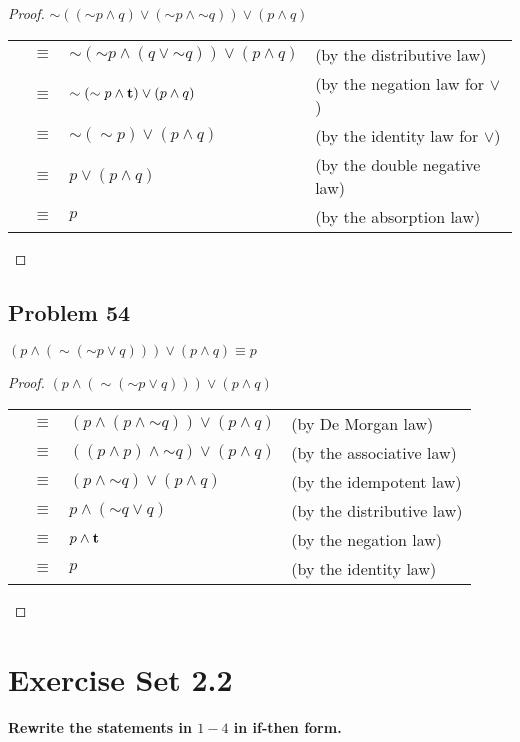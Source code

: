 \documentclass[14pt]{extarticle}
\newcommand{\true}{{\bf t}}
\begin{document}
\begin{proof}
$\sim(({\sim p} \wedge q) \vee ({\sim p} \wedge {\sim q})) \vee (p \wedge q)$

\begin{tabular}{rcll}
& $\equiv$ & $\sim({\sim p} \wedge (q \vee {\sim q})) \vee (p \wedge q)$ & (by
the distributive law) \\
 & $\equiv$ & $\sim({\sim p} \wedge \true) \vee (p \wedge q)$ &
(by the negation law for $\vee$) \\
& $\equiv$ & $\sim({\sim p}) \vee (p \wedge q)$ & (by the identity law for
$\vee$) \\
 & $\equiv$ & $p \vee (p \wedge q)$ & (by the double negative law) \\
 & $\equiv$ & $p$ & (by the absorption law) \\
\end{tabular}
\end{proof}

\subsection{Problem 54}
$(p \wedge ({\sim ({\sim p} \vee q)})) \vee (p \wedge q) \equiv p$

\begin{proof}
$(p \wedge ({\sim ({\sim p} \vee q)})) \vee (p \wedge q)$

\begin{tabular}{rcll}
 & $\equiv$ & 
$(p \wedge (p \wedge {\sim q})) \vee (p \wedge q)$ & (by De Morgan law) \\
& $\equiv$ & $((p \wedge p) \wedge {\sim q}) \vee (p \wedge q)$ & (by the
associative law) \\
& $\equiv$ & $(p \wedge {\sim q}) \vee (p \wedge q)$ & (by the idempotent law)
\\
 & $\equiv$ & $p \wedge ({\sim q} \vee q)$ & (by the distributive law) \\
 & $\equiv$ & $p \wedge \true$ & (by the negation law) \\
 & $\equiv$ & $p$ & (by the identity law) \\
\end{tabular}
\end{proof}

\section{Exercise Set 2.2}
{\bf Rewrite the statements in $1-4$ in if-then form.}
\end{document}
